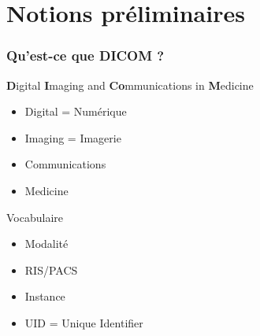 \section{Notions pr\'eliminaires}

	\frame
	{
		\frametitle{Qu'est-ce que DICOM ?}
		
		\begin{block}{\textbf{D}igital \textbf{I}maging and \textbf{Co}mmunications in \textbf{M}edicine}
		\begin{itemize}
			\item Digital = Num\'erique
		    	\item Imaging = Imagerie
		    	\item Communications
		    	\item Medicine
			\end{itemize}
		\end{block}
		
		\begin{block}{Vocabulaire}
		\begin{itemize}
			\item Modalit\'e
			\item RIS/PACS
			\item Instance
			\item UID = Unique Identifier
		\end{itemize}
		\end{block}
	}
	
